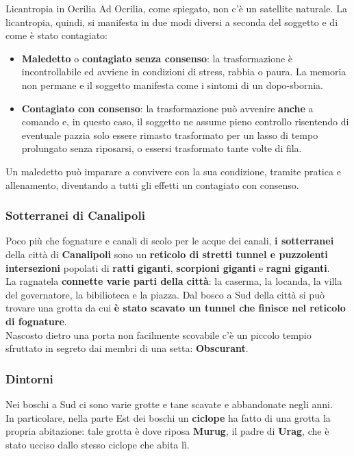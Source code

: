 \documentclass[10pt,twoside,onecolumn,openany]{book}
\begin{document}
\begin{commentbox}{{Licantropia in Ocrilia}}
Ad Ocrilia, come spiegato, non c'è un satellite naturale. La licantropia, quindi, si manifesta in due modi diversi a seconda del soggetto e di come è stato contagiato:
\begin{itemize}
\item \textbf{Maledetto} o \textbf{contagiato senza consenso}: la trasformazione è incontrollabile ed avviene in condizioni di stress, rabbia o paura. La memoria non permane e il soggetto manifesta come i sintomi di un dopo-sbornia.
\item \textbf{Contagiato con consenso}: la trasformazione può avvenire \textbf{anche} a comando e, in questo caso, il soggetto ne assume pieno controllo risentendo di eventuale pazzia solo essere rimasto trasformato per un lasso di tempo prolungato senza riposarsi, o essersi trasformato tante volte di fila.
\end{itemize}
Un maledetto può imparare a convivere con la sua condizione, tramite pratica e allenamento, diventando a tutti gli effetti un contagiato con consenso.
\end{commentbox}
\subsubsection{Sotterranei di Canalipoli}
Poco più che fognature e canali di scolo per le acque dei canali, \textbf{i sotterranei} della città di \textbf{Canalipoli} sono un \textbf{reticolo di stretti tunnel e puzzolenti intersezioni} popolati di \textbf{ratti giganti}, \textbf{scorpioni giganti} e \textbf{ragni giganti}.\\
La ragnatela \textbf{connette varie parti della città}: la caserma, la locanda, la villa del governatore, la bibilioteca e la piazza. Dal bosco a Sud della città si può trovare una grotta da cui \textbf{è stato scavato un tunnel che finisce nel reticolo di fognature}.\\
Nascosto dietro una porta non facilmente scovabile c'è un piccolo tempio sfruttato in segreto dai membri di una setta: \textbf{Obscurant}.
\subsubsection{Dintorni}
Nei boschi a Sud ci sono varie grotte e tane scavate e abbandonate negli anni.\\
In particolare, nella parte Est dei boschi un \textbf{ciclope} ha fatto di una grotta la propria abitazione: tale grotta è dove riposa \textbf{Murug}, il padre di \textbf{Urag}, che è stato ucciso dallo stesso ciclope che abita lì.
\end{document}
